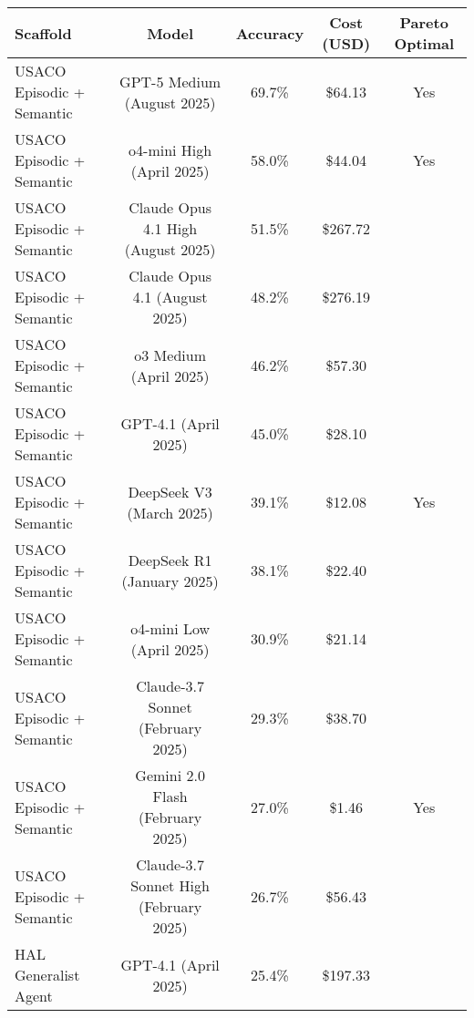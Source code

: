 \begin{tabular}{lcccc}
\toprule
Scaffold & Model & Accuracy & Cost (USD) & Pareto Optimal \\
\midrule
USACO Episodic + Semantic & GPT-5 Medium (August 2025) & 69.7\% & \$64.13 & Yes \\
USACO Episodic + Semantic & o4-mini High (April 2025) & 58.0\% & \$44.04 & Yes \\
USACO Episodic + Semantic & Claude Opus 4.1 High (August 2025) & 51.5\% & \$267.72 &  \\
USACO Episodic + Semantic & Claude Opus 4.1 (August 2025) & 48.2\% & \$276.19 &  \\
USACO Episodic + Semantic & o3 Medium (April 2025) & 46.2\% & \$57.30 &  \\
USACO Episodic + Semantic & GPT-4.1 (April 2025) & 45.0\% & \$28.10 &  \\
USACO Episodic + Semantic & DeepSeek V3 (March 2025) & 39.1\% & \$12.08 & Yes \\
USACO Episodic + Semantic & DeepSeek R1 (January 2025) & 38.1\% & \$22.40 &  \\
USACO Episodic + Semantic & o4-mini Low (April 2025) & 30.9\% & \$21.14 &  \\
USACO Episodic + Semantic & Claude-3.7 Sonnet (February 2025) & 29.3\% & \$38.70 &  \\
USACO Episodic + Semantic & Gemini 2.0 Flash (February 2025) & 27.0\% & \$1.46 & Yes \\
USACO Episodic + Semantic & Claude-3.7 Sonnet High (February 2025) & 26.7\% & \$56.43 &  \\
HAL Generalist Agent & GPT-4.1 (April 2025) & 25.4\% & \$197.33 &  \\
\bottomrule
\end{tabular}